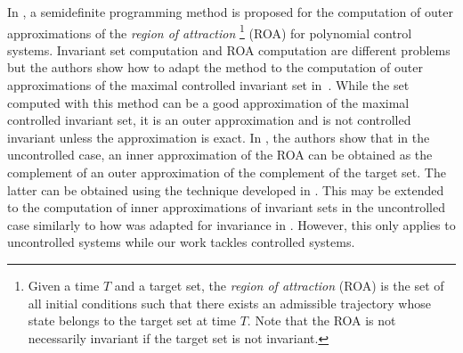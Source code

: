 \documentclass[11pt,twoside,a4paper,openright]{uclouvain-thesis}
\begin{document}
In \cite{henrion2014convex}, a semidefinite programming method is proposed for the computation of outer approximations of the \emph{region of attraction}%
\footnote{Given a time $T$ and a target set,
the \emph{region of attraction} (ROA) is the set of all initial conditions such that
there exists an admissible trajectory whose state belongs to the target set at time $T$.
Note that the ROA is not necessarily invariant if the target set is not invariant.}
(ROA) for polynomial control systems.
Invariant set computation and ROA computation are different problems
but the authors show how to adapt the method to the computation of outer approximations of the maximal controlled invariant set in~\cite{korda2014convex}.
While the set computed with this method can be a good approximation of the maximal controlled invariant set, it is an outer approximation and is not controlled invariant unless the approximation is exact.
In \cite{korda2013inner}, the authors show that in the uncontrolled case, an inner approximation of the ROA can be obtained as the complement of an outer approximation of the complement of the target set.
The latter can be obtained using the technique developed in \cite{henrion2014convex}.
This may be extended to the computation of inner approximations of invariant sets in the uncontrolled case similarly to how \cite{henrion2014convex} was adapted for invariance in \cite{korda2014convex}.
However, this only applies to uncontrolled systems while our work tackles controlled systems.
\end{document}
